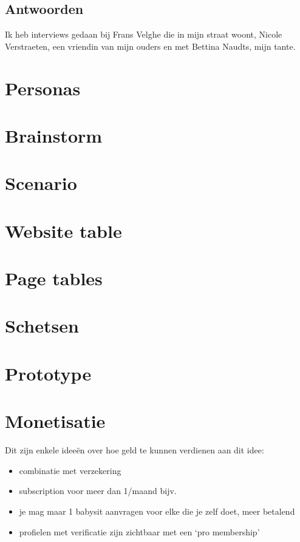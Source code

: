 \documentclass[a4paper,12pt]{article}
\begin{document}
\subsection{Antwoorden}
Ik heb interviews gedaan bij Frans Velghe die in mijn straat woont, Nicole Verstraeten, een vriendin van mijn ouders en met Bettina Naudts, mijn tante.





\section{Personas}

\section{Brainstorm}

\section{Scenario}

\section{Website table}



\section{Page tables}





\section{Schetsen}

\section{Prototype}

\section{Monetisatie}
Dit zijn enkele ideeën over hoe geld te kunnen verdienen aan dit idee:

\begin{itemize}
  \item combinatie met verzekering
  \item subscription voor meer dan 1/maand bijv.
  \item je mag maar 1 babysit aanvragen voor elke die je zelf doet, meer betalend
  \item profielen met verificatie zijn zichtbaar met een `pro membership'
\end{itemize}
\end{document}
